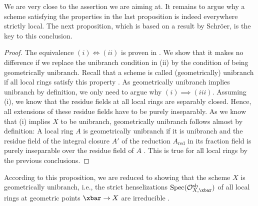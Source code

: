 \documentclass[leqno]{article}
\renewcommand{\Spec}{\mathrm{Spec}}
\begin{document}
We are very close to the assertion we are aiming at.
It remains to argue why a scheme  satisfying the properties in the last proposition is indeed everywhere strictly local.
The next proposition, which is based on a result by Schr\"oer, is the key to this conclusion. 
\begin{proof}
The equivalence $(i) \Leftrightarrow (ii)$ is proven in \cite[Proposition 2.6]{MR3649361}.
We show that it makes no difference if we replace the unibranch condition in (ii) by the condition of being geometrically unibranch.
Recall that a scheme is called (geometrically) unibranch if all local rings satisfy this property \cite[\href{https://stacks.math.columbia.edu/tag/0BQ1 }{Tag 0BQ1}]{stacksproject}.
As geometrically unibranch implies unibranch by definition, we only need to argue why $(i) \implies (iii)$.
Assuming (i), we know that the residue fields at all local rings are separably closed.
Hence, all extensions of these residue fields have to be purely inseparably. As we know that (i) implies $X$ to be unibranch, geometrically unibranch follows almost by definition:
A local ring $A$ is geometrically unibranch if it is unibranch and the residue field of the integral closure $A'$ of the reduction $A_{\mathrm{red}}$ in its fraction field is purely inseparable over the residue field of $A$ \cite[\href{https://stacks.math.columbia.edu/tag/0BPZ }{Tag 0BPZ}]{stacksproject}.
This is true for all local rings by the previous conclusions.
\end{proof}
According to this proposition, we are reduced to showing that the scheme $X$ is geometrically unibranch, i.e., the strict henselizations $\Spec(\mathcal{O}_{X,\xbar}^{\mathrm{sh}})$ of all local rings at geometric points $\xbar\rightarrow X$ are irreducible \cite[\href{https://stacks.math.columbia.edu/tag/06DM }{Tag 06DM}]{stacksproject}.
\end{document}
